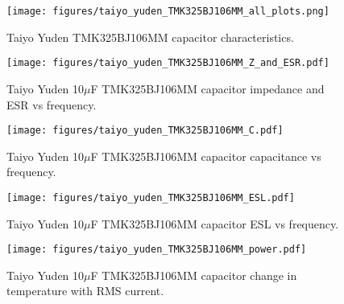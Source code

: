 \documentclass[10pt,twoside]{article}
\begin{document}
%
\begin{landscape}
\begin{figure}[p]
  \begin{center}
    \texttt{[image: figures/taiyo\_yuden\_TMK325BJ106MM\_all\_plots.png]}\\
  \end{center}
  \caption{Taiyo Yuden TMK325BJ106MM capacitor characteristics.}
  \label{fig:taiyo_yuden_TMK325BJ106MM_characteristics}
\end{figure}
\end{landscape}

%
%
%
\begin{figure}[p]
  \begin{center}
    \texttt{[image: figures/taiyo\_yuden\_TMK325BJ106MM\_Z\_and\_ESR.pdf]}
  \end{center}
  \caption{Taiyo Yuden 10$\mu$F TMK325BJ106MM capacitor impedance and ESR vs frequency.}
  \label{fig:taiyo_yuden_Z_and_ESR}
\end{figure}

\begin{figure}[p]
  \begin{center}
    \texttt{[image: figures/taiyo\_yuden\_TMK325BJ106MM\_C.pdf]}
  \end{center}
  \caption{Taiyo Yuden 10$\mu$F TMK325BJ106MM capacitor capacitance vs frequency.}
  \label{fig:taiyo_yuden_C}
\end{figure}

\begin{figure}[p]
  \begin{center}
    \texttt{[image: figures/taiyo\_yuden\_TMK325BJ106MM\_ESL.pdf]}
  \end{center}
  \caption{Taiyo Yuden 10$\mu$F TMK325BJ106MM capacitor ESL vs frequency.}
  \label{fig:taiyo_yuden_ESL}
\end{figure}

\begin{figure}[p]
  \begin{center}
    \texttt{[image: figures/taiyo\_yuden\_TMK325BJ106MM\_power.pdf]}
  \end{center}
  \caption{Taiyo Yuden 10$\mu$F TMK325BJ106MM capacitor change in temperature with RMS current.}
  \label{fig:taiyo_yuden_power}
\end{figure}
\end{document}
